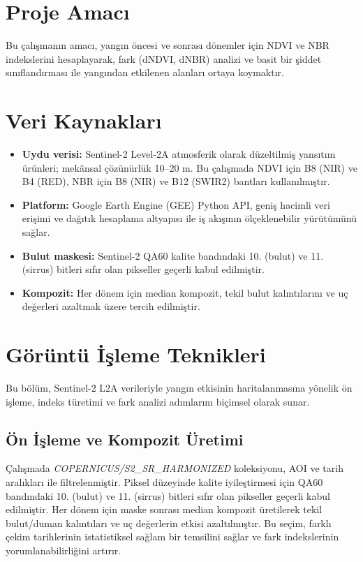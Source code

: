 \documentclass[11pt,a4paper]{article}
\begin{document}
\section{Proje Amacı}
Bu çalışmanın amacı, yangın öncesi ve sonrası dönemler için NDVI ve NBR indekslerini
hesaplayarak, fark (dNDVI, dNBR) analizi ve basit bir şiddet sınıflandırması ile
yangından etkilenen alanları ortaya koymaktır.

\section{Veri Kaynakları}

\begin{itemize}
  \item \textbf{Uydu verisi:} Sentinel-2 Level-2A atmosferik olarak düzeltilmiş yansıtım ürünleri; mekânsal çözünürlük 10--20 m. Bu çalışmada NDVI için B8 (NIR) ve B4 (RED), NBR için B8 (NIR) ve B12 (SWIR2) bantları kullanılmıştır.
  \item \textbf{Platform:} Google Earth Engine (GEE) Python API, geniş hacimli veri erişimi ve dağıtık hesaplama altyapısı ile iş akışının ölçeklenebilir yürütümünü sağlar.
  \item \textbf{Bulut maskesi:} Sentinel-2 QA60 kalite bandındaki 10. (bulut) ve 11. (sirrus) bitleri sıfır olan pikseller geçerli kabul edilmiştir.
  \item \textbf{Kompozit:} Her dönem için median kompozit, tekil bulut kalıntılarını ve uç değerleri azaltmak üzere tercih edilmiştir.
\end{itemize}


\section{Görüntü İşleme Teknikleri}
Bu bölüm, Sentinel-2 L2A verileriyle yangın etkisinin haritalanmasına yönelik ön işleme, indeks türetimi ve fark analizi adımlarını biçimsel olarak sunar.

\subsection*{Ön İşleme ve Kompozit Üretimi}
Çalışmada \emph{COPERNICUS/S2\_SR\_HARMONIZED} koleksiyonu, AOI ve tarih aralıkları ile filtrelenmiştir. Piksel düzeyinde kalite iyileştirmesi için QA60 bandındaki 10. (bulut) ve 11. (sirrus) bitleri sıfır olan pikseller geçerli kabul edilmiştir. Her dönem için maske sonrası median kompozit üretilerek tekil bulut/duman kalıntıları ve uç değerlerin etkisi azaltılmıştır. Bu seçim, farklı çekim tarihlerinin istatistiksel sağlam bir temsilini sağlar ve fark indekslerinin yorumlanabilirliğini artırır.
\end{document}
